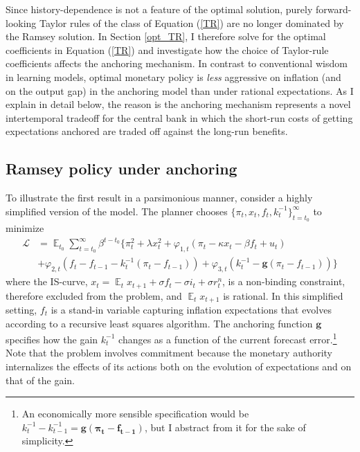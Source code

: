 \documentclass[11pt]{article}
\renewcommand{\[}{\begin{equation}}
\renewcommand{\]}{\end{equation}}
\DeclareMathOperator{\E}{\mathbb{E}}
\begin{document}
Since history-dependence is not a feature of the optimal solution, purely forward-looking Taylor rules of the class of Equation (\ref{TR}) are no longer dominated by the Ramsey solution. In Section \ref{opt_TR}, I therefore solve for the optimal coefficients in Equation (\ref{TR}) and investigate how the choice of Taylor-rule coefficients affects the anchoring mechanism. In contrast to conventional wisdom in learning models, optimal monetary policy is \emph{less} aggressive on inflation (and on the output gap) in the anchoring model than under rational expectations. As I explain in detail below, the reason is the anchoring mechanism represents a novel intertemporal tradeoff for the central bank in which the short-run costs of getting expectations anchored are traded off against the long-run benefits.
 

\subsection{Ramsey policy under anchoring}\label{ramsey}

To illustrate the first result in a parsimonious manner, consider a highly simplified version of the model. The planner chooses $\{\pi_t, x_t, f_t, k_t^{-1}\}_{t=t_0}^{\infty}$ to minimize
 \begin{align*}
\mathcal{L} &= \E_{t_0}\sum_{t=t_0}^{\infty} \beta^{t-t_0}\bigg\{ \pi_t^2  + \lambda x_t^2 + \varphi_{1,t} (\pi_t -\kappa x_t- \beta f_t +u_t) \\ &+ \varphi_{2,t}(f_t - f_{t-1} -k_t^{-1}(\pi_t - f_{t-1})) + \varphi_{3,t}(k_t^{-1} - \mathbf{g}(\pi_t - f_{t-1})) \bigg\}
 \end{align*}
 where the IS-curve, $x_t = \E_t x_{t+1}+\sigma f_t -\sigma i_t +\sigma r_t^n$, is a non-binding constraint, therefore excluded from the problem, and $\E_t x_{t+1}$ is rational. In this simplified setting, $f_t$ is a stand-in variable capturing inflation expectations that evolves according to a recursive least squares algorithm. The anchoring function $\mathbf{g}$ specifies how the gain $k_t^{-1}$ changes as a function of the current forecast error.\footnote{An economically more sensible specification would be $k_t^{-1}-k_{t-1}^{-1} = \mathbf{g(\pi_t-f_{t-1})}$, but I abstract from it for the sake of simplicity.} Note that the problem involves commitment because the monetary authority internalizes the effects of its actions both on the evolution of expectations and on that of the gain. 
 
\end{document}
